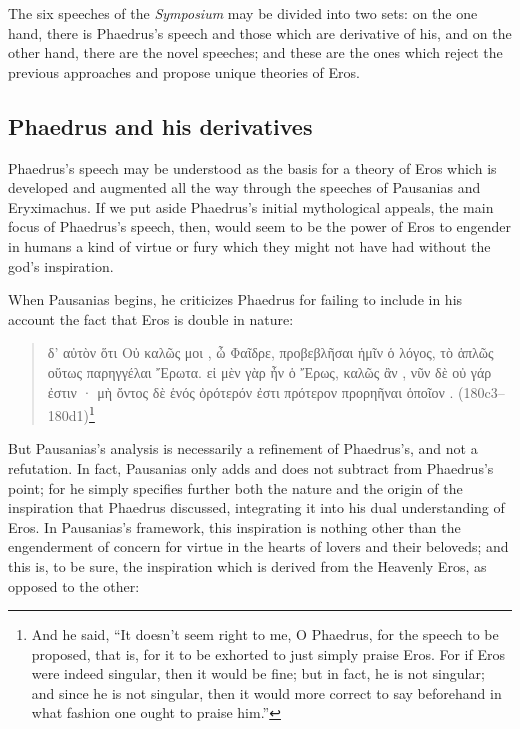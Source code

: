 The six speeches of the \emph{Symposium} may be divided into two sets:
on the one hand, there is Phaedrus's speech and those which are
derivative of his, and on the other hand, there are the novel speeches;
and these are the ones which reject the previous approaches and propose
unique theories of Eros.

\subsection*{Phaedrus and his derivatives}

Phaedrus's speech may be understood as the basis for a theory of Eros
which is developed and augmented all the way through the speeches of
Pausanias and Eryximachus. If we put aside Phaedrus's initial
mythological appeals, the main focus of Phaedrus's speech, then, would
seem to be the power of Eros to engender in humans a kind of virtue or
fury which they might not have had without the god's inspiration.

When Pausanias begins, he criticizes Phaedrus for failing to include in
his account the fact that Eros is double in nature:

\begin{quote}
\textgreek{ δ' αὐτὸν ὅτι Οὐ καλῶς μοι , ὦ
Φαῖδρε, προβεβλῆσαι ἡμῖν ὁ λόγος, τὸ ἁπλῶς οὕτως
παρηγγέλαι  Ἔρωτα. εἰ μὲν γὰρ  ἦν
ὁ Ἔρως, καλῶς ἂν , νῦν δὲ οὐ γάρ ἐστιν · μὴ ὄντος
δὲ ἑνός ὀρότερόν ἐστι πρότερον προρηῆναι ὁποῖον
 .} (180c3--180d1)\footnote{And he said, ``It
doesn't seem right to me, O Phaedrus, for the speech to be proposed,
that is, for it to be exhorted to just simply praise Eros. For if Eros
were indeed singular, then it would be fine; but in fact, he is not
singular; and since he is not singular, then it would more correct to
say beforehand in what fashion one ought to praise him.''}
\end{quote}

But Pausanias's analysis is necessarily a refinement of Phaedrus's, and
not a refutation. In fact, Pausanias only adds and does not subtract
from Phaedrus's point; for he simply specifies further both the nature
and the origin of the inspiration that Phaedrus discussed, integrating
it into his dual understanding of Eros. In Pausanias's framework, this
inspiration is nothing other than the engenderment of concern for virtue
in the hearts of lovers and their beloveds; and this is, to be sure, the
inspiration which is derived from the Heavenly Eros, as opposed to the
other:

